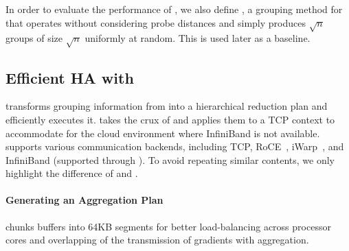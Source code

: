 
In order to evaluate the performance of \marcopolo, we also define \strongrandom, a grouping method for \mlha that operates without considering probe distances and simply produces $\sqrt{n}$ groups of size $\sqrt{n}$ uniformly at random. This is used later as a baseline.

\subsection{Efficient HA with \ha}
\label{sec:haimpl}
\ha transforms grouping information from \marcopolo into a hierarchical reduction plan and efficiently executes it. \ha takes the crux of \phub and applies them to a TCP context to accommodate for the cloud environment where InfiniBand is not available.
\ha supports various communication backends, including TCP, RoCE~\cite{softroce}, iWarp~\cite{softiwarp}, and InfiniBand (supported through \phub). To avoid repeating similar contents, we only highlight the difference of \ha and \phub.


\paragraph{Generating an Aggregation Plan}
\label{sec:generatingAggregationPlan}
\ha chunks buffers into 64KB segments for better load-balancing across processor cores and overlapping of the transmission of gradients with aggregation. %


